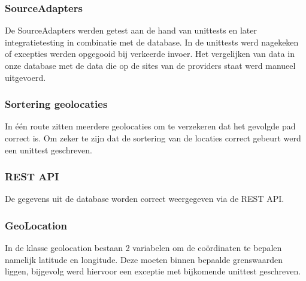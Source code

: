 \documentclass[ps,a4paper,oneside]{report}
\begin{document}
\subsubsection{SourceAdapters}
De SourceAdapters werden getest aan de hand van unittests en later integratietesting in combinatie met de database. In de unittests werd nagekeken of excepties werden opgegooid bij verkeerde invoer. Het vergelijken van data in onze database met de data die op de sites van de providers staat werd manueel uitgevoerd.
\subsubsection{Sortering geolocaties}
In \'e\'en route zitten meerdere geolocaties om te verzekeren dat het gevolgde pad correct is. Om zeker te zijn dat de sortering van de locaties correct gebeurt werd een unittest geschreven.
\subsubsection{REST API}
De gegevens uit de database worden correct weergegeven via de REST API.
\subsubsection{GeoLocation}
In de klasse geolocation bestaan 2 variabelen om de co\"ordinaten te bepalen namelijk latitude en longitude. Deze moeten binnen bepaalde grenswaarden liggen, bijgevolg werd hiervoor een exceptie met bijkomende unittest geschreven.
\end{document}

